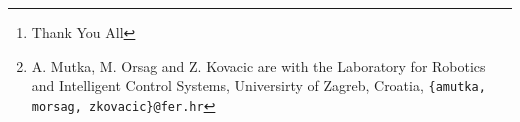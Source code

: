 
\author{Alan Mutka, Matko Orsag, and Zdenko Kovacic%
\thanks{Thank You All}%
\thanks{A. Mutka, M. Orsag and Z. Kovacic are with the Laboratory for Robotics and Intelligent Control Systems, Universirty of Zagreb, Croatia, {\tt\small\{amutka, morsag, zkovacic\}{@}fer.hr}}
}
